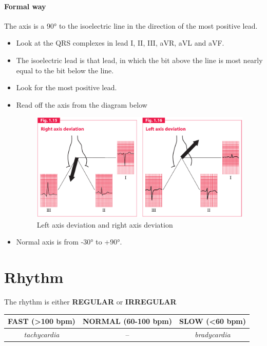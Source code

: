 \documentclass[11pt,a4paper]{report}
\begin{document}
\paragraph{Formal way}
The axis is a \ang{90} to the isoelectric line in the direction of the most positive lead. 

\begin{itemize}
	\item Look at the QRS complexes in lead I, II, III, aVR, aVL and aVF. 
	\item The isoelectric lead is that lead, in which the bit above the line is most nearly equal to the bit below the line. 
	\item Look for the most positive lead. 
	\item Read off the axis from the diagram below 
	\begin{figure}[htp]
		\centering \includegraphics[scale=0.43]{RAD-LAD.png}
		\centering \caption[Left axis deviation and right axis deviation]{Left axis deviation and right axis deviation \cite{hampton2013ecg}}
		\label{Axis-deviation}
	\end{figure}
	\item Normal axis is from -\ang{30} to +\ang{90}.
\end{itemize}

\newpage
\section{Rhythm}
The rhythm is either \textbf{REGULAR} or \textbf{IRREGULAR} 


\begin{center}
	\begin{tabular}{c c c} 
		\toprule[1.5pt]
		FAST (\textgreater100 bpm)	& NORMAL (60-100 bpm)	& SLOW (\textless60 bpm) \\ 
		\midrule
		\textit{tachycardia}		& --				& \textit{bradycardia} \\ 
		\bottomrule[1.5pt]
	\end{tabular}
\end{center}
\end{document}
